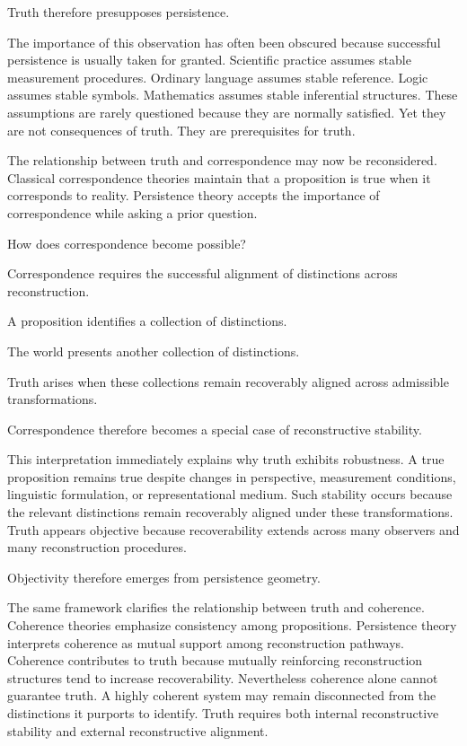 \documentclass[12pt,oneside]{article}
\theoremstyle{definition}
\begin{document}
Truth therefore presupposes persistence.

The importance of this observation has often been obscured because successful persistence is usually taken for granted. Scientific practice assumes stable measurement procedures. Ordinary language assumes stable reference. Logic assumes stable symbols. Mathematics assumes stable inferential structures. These assumptions are rarely questioned because they are normally satisfied. Yet they are not consequences of truth. They are prerequisites for truth.

The relationship between truth and correspondence may now be reconsidered. Classical correspondence theories maintain that a proposition is true when it corresponds to reality. Persistence theory accepts the importance of correspondence while asking a prior question.

How does correspondence become possible?

Correspondence requires the successful alignment of distinctions across reconstruction.

A proposition identifies a collection of distinctions.

The world presents another collection of distinctions.

Truth arises when these collections remain recoverably aligned across admissible transformations.

Correspondence therefore becomes a special case of reconstructive stability.

This interpretation immediately explains why truth exhibits robustness. A true proposition remains true despite changes in perspective, measurement conditions, linguistic formulation, or representational medium. Such stability occurs because the relevant distinctions remain recoverably aligned under these transformations. Truth appears objective because recoverability extends across many observers and many reconstruction procedures.

Objectivity therefore emerges from persistence geometry.

The same framework clarifies the relationship between truth and coherence. Coherence theories emphasize consistency among propositions. Persistence theory interprets coherence as mutual support among reconstruction pathways. Coherence contributes to truth because mutually reinforcing reconstruction structures tend to increase recoverability. Nevertheless coherence alone cannot guarantee truth. A highly coherent system may remain disconnected from the distinctions it purports to identify. Truth requires both internal reconstructive stability and external reconstructive alignment.
\end{document}
